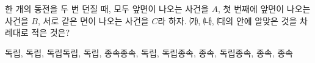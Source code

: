한 개의 동전을 두 번 던질 때, 모두 앞면이 나오는 사건을 $A$, 첫 번째에 앞면이 나오는 사건을 $B$, 서로 같은 면이 나오는 사건을 $C$라 하자. ㈎, ㈏, ㈐의 \blank[1.2em] 안에 알맞은 것을 차례대로 적은 것은? 
\begin{choicesii}{독립, 독립, 독립}{독립, 독립, 종속}{종속, 독립, 독립}{종속, 종속, 독립}{종속, 종속, 종속}\end{choicesii}
